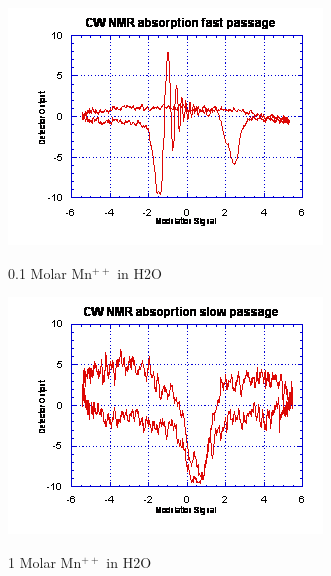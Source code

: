 \documentclass{../lab}
\begin{document}
\begin{enumerate}
    \begin{figure}[h]
    \begin{minipage}[t]{0.32\textwidth}
        \href{http://experimentationlab.berkeley.edu/sites/default/files/images/NMR21.gif}{\includegraphics[width=0.95\linewidth,keepaspectratio]{images/NMR21.png}}
        \caption{0.1 Molar Mn$^{++}$ in H2O}
        \label{fig:TenthMolarMn}
    \end{minipage}\hfill
    \begin{minipage}[t]{0.32\textwidth}
        \href{http://experimentationlab.berkeley.edu/sites/default/files/images/NMR22.gif}{\includegraphics[width=\linewidth,keepaspectratio]{images/NMR22.png}}
        \caption{1 Molar Mn$^{++}$ in H2O}
    \end{minipage}\hfill

\end{figure}
\end{enumerate}
\end{document}
